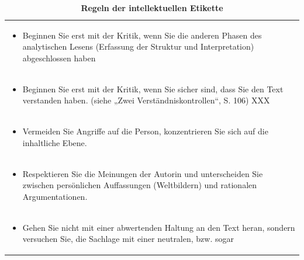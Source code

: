 \documentclass[]{book}
\providecommand{\tightlist}{%
  \setlength{\itemsep}{0pt}\setlength{\parskip}{0pt}}
\theoremstyle{definition}
\theoremstyle{definition}
\theoremstyle{definition}
\theoremstyle{remark}
\begin{document}
\begin{longtable}[]{@{}l@{}}
\caption{\textbf{\label{tab:etikette} Regeln der intellektuellen
Etikette}}\tabularnewline
\toprule
\begin{minipage}[t]{0.97\columnwidth}\raggedright\strut
\begin{itemize}
\tightlist
\item
  Beginnen Sie erst mit der Kritik, wenn Sie die anderen Phasen des
  analytischen Lesens (Erfassung der Struktur und Interpretation)
  abgeschlossen haben \vspace{-6mm}
\end{itemize}\strut
\end{minipage}\tabularnewline
\begin{minipage}[t]{0.97\columnwidth}\raggedright\strut
\begin{itemize}
\tightlist
\item
  Beginnen Sie erst mit der Kritik, wenn Sie sicher sind, dass Sie den
  Text verstanden haben. (siehe „Zwei Verständniskontrollen``, S. 106)
  XXX \vspace{-6mm}
\end{itemize}\strut
\end{minipage}\tabularnewline
\begin{minipage}[t]{0.97\columnwidth}\raggedright\strut
\begin{itemize}
\tightlist
\item
  Vermeiden Sie Angriffe auf die Person, konzentrieren Sie sich auf die
  inhaltliche Ebene. \vspace{-6mm}
\end{itemize}\strut
\end{minipage}\tabularnewline
\begin{minipage}[t]{0.97\columnwidth}\raggedright\strut
\begin{itemize}
\tightlist
\item
  Respektieren Sie die Meinungen der Autorin und unterscheiden Sie
  zwischen persönlichen Auffassungen (Weltbildern) und rationalen
  Argumentationen. \vspace{-6mm}
\end{itemize}\strut
\end{minipage}\tabularnewline
\begin{minipage}[t]{0.97\columnwidth}\raggedright\strut
\begin{itemize}
\tightlist
\item
  Gehen Sie nicht mit einer abwertenden Haltung an den Text heran,
  sondern versuchen Sie, die Sachlage mit einer neutralen, bzw. sogar

\end{itemize}
\end{minipage}
\end{longtable}
\end{document}

